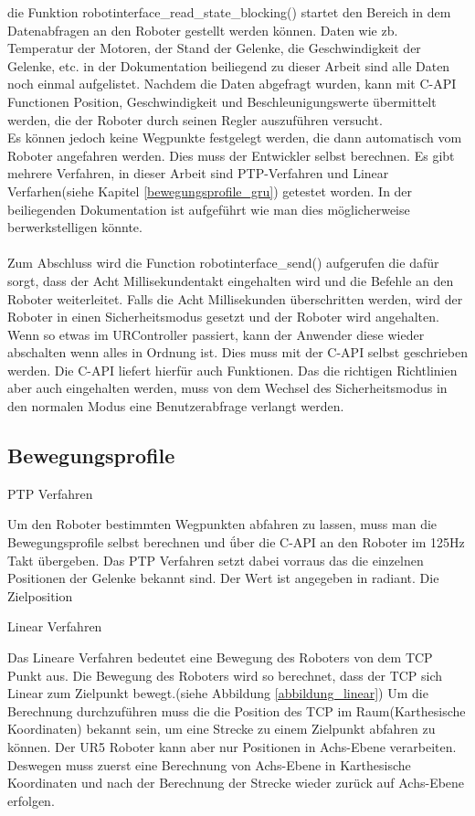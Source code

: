 die Funktion robotinterface\_read\_state\_blocking() startet den Bereich in dem Datenabfragen an den Roboter gestellt werden können. Daten wie zb. Temperatur der Motoren, der Stand der Gelenke, die Geschwindigkeit der Gelenke, etc. in der Dokumentation beiliegend zu dieser Arbeit sind alle Daten noch einmal aufgelistet. Nachdem die Daten abgefragt wurden, kann mit C-\acs{API} Functionen Position, Geschwindigkeit und Beschleunigungswerte übermittelt werden, die der Roboter durch seinen Regler auszuführen versucht.\\
Es können jedoch keine Wegpunkte festgelegt werden, die dann automatisch vom Roboter angefahren werden. Dies muss der Entwickler selbst 
berechnen. Es gibt mehrere Verfahren, in dieser Arbeit sind \ac{PTP}-Verfahren und Linear Verfarhen(siehe Kapitel \ref{bewegungsprofile_gru}) getestet worden. In der beiliegenden Dokumentation ist aufgeführt wie man dies möglicherweise berwerkstelligen könnte.
\\\\
Zum Abschluss wird die Function robotinterface\_send() aufgerufen die dafür sorgt, dass der Acht Millisekundentakt eingehalten wird und die Befehle an den Roboter weiterleitet. Falls die Acht Millisekunden überschritten werden, wird der Roboter in einen Sicherheitsmodus gesetzt
und der Roboter wird angehalten.\\
Wenn so etwas im URController passiert, kann der Anwender diese wieder abschalten wenn alles in Ordnung ist. Dies muss mit der C-\acs{API} selbst geschrieben werden. Die C-\acs{API} liefert hierfür auch Funktionen. Das die richtigen Richtlinien aber auch eingehalten werden, muss von dem Wechsel des Sicherheitsmodus in den normalen Modus eine Benutzerabfrage verlangt werden.

\subsection{Bewegungsprofile}
\label{sub:bewegungsprofile_gru}

\acs{PTP} Verfahren 

Um den Roboter bestimmten Wegpunkten abfahren zu lassen, muss man die Bewegungsprofile selbst berechnen und ǘber die C-API an den Roboter im 125Hz Takt übergeben. Das \ac{PTP} Verfahren setzt dabei vorraus das die einzelnen Positionen der Gelenke bekannt sind. Der Wert ist angegeben in radiant. Die Zielposition

Linear Verfahren

Das Lineare Verfahren bedeutet eine Bewegung des Roboters von dem \ac{TCP} Punkt aus. Die Bewegung des Roboters wird so berechnet, dass der \acs{TCP} sich Linear zum Zielpunkt bewegt.(siehe Abbildung \ref{abbildung_linear})
Um die Berechnung durchzuführen muss die die Position des \acs{TCP} im Raum(Karthesische Koordinaten) bekannt sein, um eine Strecke zu einem Zielpunkt abfahren zu können. Der UR5 Roboter kann aber nur Positionen in Achs-Ebene verarbeiten. Deswegen muss zuerst eine Berechnung von Achs-Ebene in Karthesische Koordinaten und nach der Berechnung der Strecke wieder zurück auf Achs-Ebene erfolgen.

